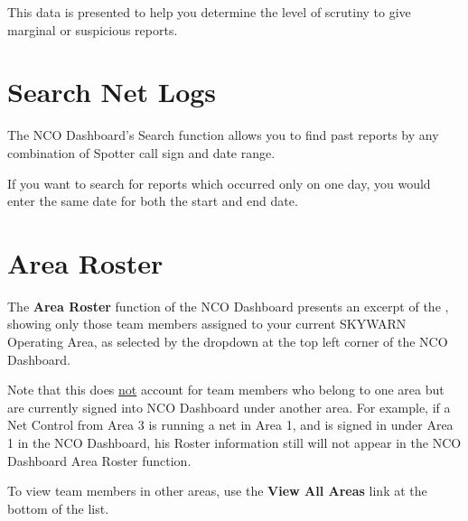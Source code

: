 \documentclass[pdflatex,letterpaper,twoside,12pt]{book}
\begin{document}
This data is presented to help you determine the level of scrutiny to give marginal or suspicious reports.



\section{Search Net Logs}\label{dash-search-logs}

The NCO Dashboard's Search function allows you to find past reports by any combination of Spotter call sign and date range.

If you want to search for reports which occurred only on one day, you would enter the same date for both the start and end date.


\section{Area Roster}\label{dash-area-roster}

The \textbf{Area Roster} function of the NCO Dashboard presents an excerpt of the , showing only those team members assigned to your current SKYWARN Operating Area, as selected by the dropdown at the top left corner of the NCO Dashboard.

Note that this does \underline{not} account for team members who belong to one area but are currently signed into NCO Dashboard under another area.  For example, if a Net Control from Area 3 is running a net in Area 1, and is signed in under Area 1 in the NCO Dashboard, his Roster information still will not appear in the NCO Dashboard Area Roster function.

To view team members in other areas, use the \textbf{View All Areas} link at the bottom of the list.

\end{document}
